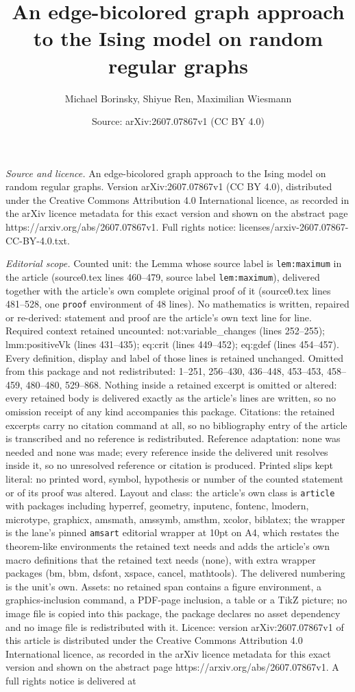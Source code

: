\documentclass[10pt,a4paper]{amsart}
\title[An edge-bicolored graph approach to the Ising model on rando]{An edge-bicolored graph approach to the Ising model on random regular graphs}
\author{Michael Borinsky, Shiyue Ren, Maximilian Wiesmann}
\date{Source: arXiv:2607.07867v1 (CC BY 4.0)}
\begin{document}
\maketitle

\noindent\emph{Source and licence.} An edge-bicolored graph approach to the Ising model on random regular graphs. Version arXiv:2607.07867v1 (CC BY 4.0), distributed under the Creative Commons Attribution 4.0 International licence, as recorded in the arXiv licence metadata for this exact version and shown on the abstract page https://arxiv.org/abs/2607.07867v1. Full rights notice: licenses/arxiv-2607.07867-CC-BY-4.0.txt.\par\smallskip

\noindent\textit{Editorial scope.} Counted unit: the Lemma whose source label is \texttt{lem:maximum} in the article (source0.tex lines 460--479, source label \texttt{lem:maximum}), delivered together with the article's own complete original proof of it (source0.tex lines 481--528, one \texttt{proof} environment of 48 lines). No mathematics is written, repaired or re-derived: statement and proof are the article's own text line for line. Required context retained uncounted: not:variable\_changes (lines 252--255); lmm:positiveVk (lines 431--435); eq:crit (lines 449--452); eq:gdef (lines 454--457). Every definition, display and label of those lines is retained unchanged. Omitted from this package and not redistributed: 1--251, 256--430, 436--448, 453--453, 458--459, 480--480, 529--868. Nothing inside a retained excerpt is omitted or altered: every retained body is delivered exactly as the article's lines are written, so no omission receipt of any kind accompanies this package. Citations: the retained excerpts carry no citation command at all, so no bibliography entry of the article is transcribed and no reference is redistributed. Reference adaptation: none was needed and none was made; every reference inside the delivered unit resolves inside it, so no unresolved reference or citation is produced. Printed slips kept literal: no printed word, symbol, hypothesis or number of the counted statement or of its proof was altered. Layout and class: the article's own class is \texttt{article} with packages including hyperref, geometry, inputenc, fontenc, lmodern, microtype, graphicx, amsmath, amssymb, amsthm, xcolor, biblatex; the wrapper is the lane's pinned \texttt{amsart} editorial wrapper at 10pt on A4, which restates the theorem-like environments the retained text needs and adds the article's own macro definitions that the retained text needs (none), with extra wrapper packages (bm, bbm, dsfont, xspace, cancel, mathtools). The delivered numbering is the unit's own. Assets: no retained span contains a figure environment, a graphics-inclusion command, a PDF-page inclusion, a table or a TikZ picture; no image file is copied into this package, the package declares no asset dependency and no image file is redistributed with it. Licence: version arXiv:2607.07867v1 of this article is distributed under the Creative Commons Attribution 4.0 International licence, as recorded in the arXiv licence metadata for this exact version and shown on the abstract page https://arxiv.org/abs/2607.07867v1. A full rights notice is delivered at 
\end{document}
